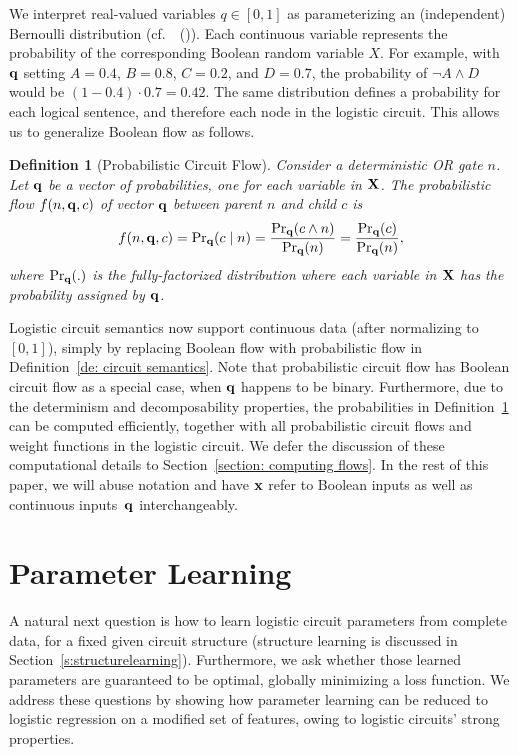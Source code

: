 \documentclass[letterpaper]{article} %
\newtheorem{definition}{Definition}
\newcommand{\sample}{{\bf x}}
\newcommand{\citet}[1]{\citeauthor{#1}~(\citeyear{#1})}
\begin{document}
We interpret real-valued variables $q \in [0,1]$ as parameterizing an (independent) Bernoulli distribution (cf.~\citet{semanticLoss}). Each continuous variable represents the probability of the corresponding Boolean random variable $X$. For example, with $\bf q$ setting $A=0.4$, $B=0.8$, $C=0.2$, and $D=0.7$, the probability of $\neg A \land D$ would be $(1-0.4)\cdot 0.7=0.42$. The same distribution defines a probability for each logical sentence, and therefore each node in the logistic circuit.
This allows us to generalize Boolean flow as follows.

\begin{definition}[Probabilistic Circuit Flow]
\label{definition: probabilistic flow}
Consider a deterministic OR gate $n$.
Let $\bf q$ be a vector of probabilities, one for each variable in $\bf X$.
The probabilistic flow $f(n,{\bf q},c)$ of vector $\bf q$ between parent $n$ and child $c$ is
\begin{align*}
f(n,{\bf q},c) = {\Pr}_{\bf q}(c \mid n) = \frac{\Pr_{\bf q}(c \land n)}{ \Pr_{\bf q}(n) } = \frac{\Pr_{\bf q}(c)}{ \Pr_{\bf q}(n) },
\end{align*}
where $\Pr_{\bf q}(.)$ is the fully-factorized distribution where each variable in  $\bf X$ has the probability assigned by $\bf q$.
\end{definition}
Logistic circuit semantics now support continuous data (after normalizing to $[0,1]$), simply by replacing Boolean flow with probabilistic flow in Definition~\ref{de: circuit semantics}.
Note that probabilistic circuit flow has Boolean circuit flow as a special case, when ${\bf q}$ happens to be binary.
Furthermore, due to the determinism and decomposability properties, the probabilities in Definition~\ref{definition: probabilistic flow} can be computed efficiently, together with all probabilistic circuit flows and weight functions in the logistic circuit. We defer the discussion of these computational details to Section~\ref{section: computing flows}.
In the rest of this paper, we will abuse notation and have $\sample$ refer to Boolean inputs as well as continuous inputs~${\bf q}$ interchangeably.

\section{Parameter Learning}
\label{section: parameter learning}

A natural next question is how to learn logistic circuit parameters from complete data, for a fixed given circuit structure (structure learning is discussed in Section~\ref{s:structurelearning}). Furthermore, we ask whether those learned parameters are guaranteed to be optimal, globally minimizing a loss function.
We address these questions by showing how parameter learning can be reduced to logistic regression on a modified set of features, owing to logistic circuits' strong properties.
\end{document}
